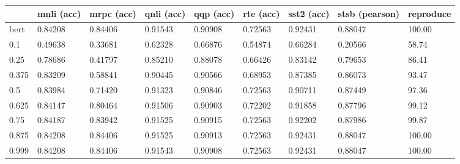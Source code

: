 \begin{tabular}{lllllllll}
\toprule
{} & mnli (acc) & mrpc (acc) & qnli (acc) & qqp (acc) & rte (acc) & sst2 (acc) & stsb (pearson) & reproduce \\
\midrule
bert  &    0.84208 &    0.84406 &    0.91543 &   0.90908 &   0.72563 &    0.92431 &        0.88047 &    100.00 \\
0.1   &    0.49638 &    0.33681 &    0.62328 &   0.66876 &   0.54874 &    0.66284 &        0.20566 &     58.74 \\
0.25  &    0.78686 &    0.41797 &    0.85210 &   0.88078 &   0.66426 &    0.83142 &        0.79653 &     86.41 \\
0.375 &    0.83209 &    0.58841 &    0.90445 &   0.90566 &   0.68953 &    0.87385 &        0.86073 &     93.47 \\
0.5   &    0.83984 &    0.71420 &    0.91323 &   0.90846 &   0.72563 &    0.90711 &        0.87449 &     97.36 \\
0.625 &    0.84147 &    0.80464 &    0.91506 &   0.90903 &   0.72202 &    0.91858 &        0.87796 &     99.12 \\
0.75  &    0.84187 &    0.83942 &    0.91525 &   0.90915 &   0.72563 &    0.92202 &        0.87986 &     99.87 \\
0.875 &    0.84208 &    0.84406 &    0.91525 &   0.90913 &   0.72563 &    0.92431 &        0.88047 &    100.00 \\
0.999 &    0.84208 &    0.84406 &    0.91543 &   0.90908 &   0.72563 &    0.92431 &        0.88047 &    100.00 \\
\bottomrule
\end{tabular}
